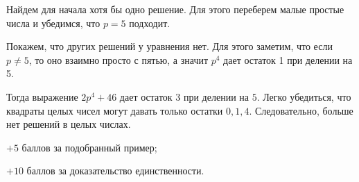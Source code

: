 \solutionSection

Найдем для начала хотя бы одно решение. Для этого переберем малые простые числа и убедимся, что $p = 5$ подходит.
	
Покажем, что других решений у уравнения нет. Для этого заметим, что если $p \neq 5$, то оно взаимно просто с пятью, а значит $p^4$ дает остаток 1 при делении на 5.

Тогда выражение $2p^4 + 46$ дает остаток $3$ при делении на $5$. Легко убедиться, что квадраты целых чисел могут давать только остатки $0, 1, 4$. Следовательно, больше нет решений в целых числах.


\additionalCriteria

	$+5$ баллов за подобранный пример;
	
	$+10$ баллов за доказательство единственности.

	
